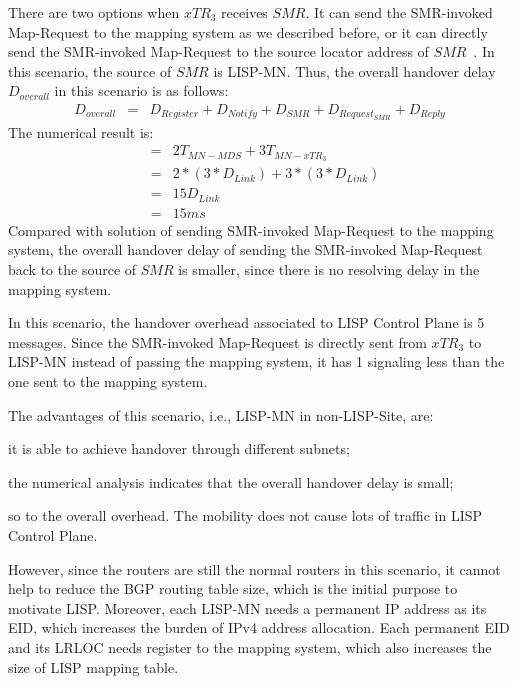 There are two options when $xTR_3$ receives $SMR$. It can send the SMR-invoked Map-Request to the mapping system as we described before, or it can directly send the SMR-invoked Map-Request to the source locator address of $SMR$~\cite{rfc6830}. In this scenario, the source of $SMR$ is LISP-MN. Thus, the overall handover delay $D_{overall}$ in this scenario is as follows:
\begin{eqnarray}
D_{overall} &=& D_{Register} + D_{Notify} + D_{SMR} + D_{Request_{SMR}} + D_{Reply} 
\end{eqnarray}
The numerical result is:
\begin{eqnarray}
&=& 2T_{MN-MDS} + 3T_{MN-xTR_3}  \nonumber \\
&=& 2* (3*D_{Link}) + 3*(3*D_{Link}) \nonumber \\
&=& 15D_{Link} \nonumber \\
&=& 15 ms \nonumber
\end{eqnarray}
Compared with solution of sending SMR-invoked Map-Request to the mapping system, the overall handover delay of sending the SMR-invoked Map-Request back to the source of $SMR$ is smaller, since there is no resolving delay in the mapping system. %

In this scenario, the handover overhead associated to LISP Control Plane is 5 messages. Since the SMR-invoked Map-Request is directly sent from $xTR_3$ to LISP-MN instead of passing the mapping system, it has 1 signaling less than the one sent to the mapping system.

The advantages of this scenario, i.e., LISP-MN in non-LISP-Site, are: 
\begin{inparaenum}[1)]
	\item it is able to achieve handover through different subnets;
	\item the numerical analysis indicates that the overall handover delay is small;
	\item so to the overall overhead. The mobility does not cause lots of traffic in LISP Control Plane.
\end{inparaenum}
However, since the routers are still the normal routers in this scenario, it cannot help to reduce the BGP routing table size, which is the initial purpose to motivate LISP. Moreover, each LISP-MN needs a permanent IP address as its EID, which increases the burden of IPv4 address allocation. Each permanent EID and its LRLOC needs register to the mapping system, which also increases the size of LISP mapping table.

